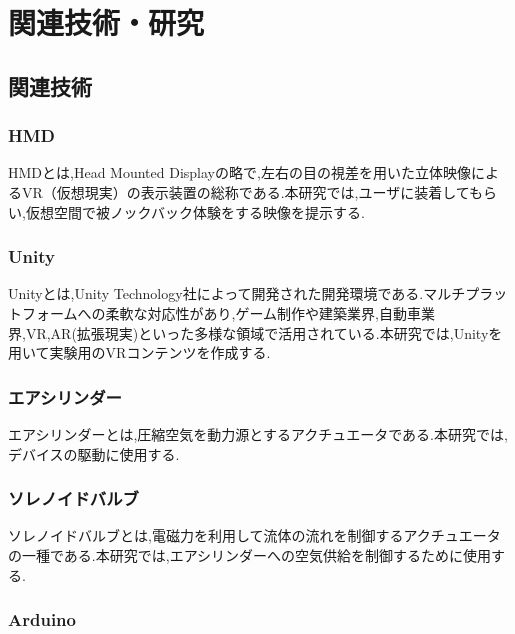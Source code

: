 \chapter{関連技術・研究}

\section{関連技術}
\subsection{HMD}

HMDとは,Head Mounted Displayの略で,左右の目の視差を用いた立体映像によるVR（仮想現実）の表示装置の総称である.本研究では,ユーザに装着してもらい,仮想空間で被ノックバック体験をする映像を提示する.


\subsection{Unity}

Unityとは,Unity Technology社によって開発された開発環境である.マルチプラットフォームへの柔軟な対応性があり,ゲーム制作や建築業界,自動車業界,VR,AR(拡張現実)といった多様な領域で活用されている.本研究では,Unityを用いて実験用のVRコンテンツを作成する.

\subsection{エアシリンダー}

エアシリンダーとは,圧縮空気を動力源とするアクチュエータである.本研究では,デバイスの駆動に使用する.

\subsection{ソレノイドバルブ}

ソレノイドバルブとは,電磁力を利用して流体の流れを制御するアクチュエータの一種である.本研究では,エアシリンダーへの空気供給を制御するために使用する.

\subsection{Arduino}


